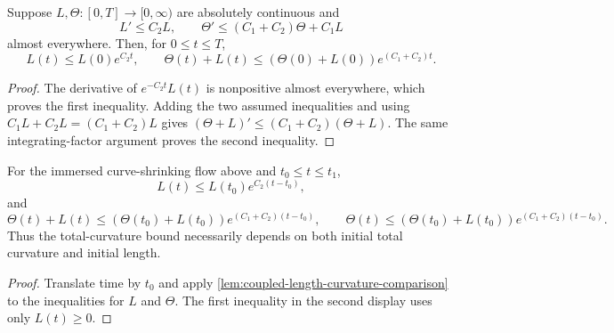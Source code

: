 \begin{lemma}
\label{lem:coupled-length-curvature-comparison}
\notready
Suppose $L,\Theta\colon[0,T]\to[0,\infty)$ are absolutely continuous and
\[
 L'\le C_2L,\qquad
 \Theta'\le(C_1+C_2)\Theta+C_1L
\]
almost everywhere.  Then, for $0\le t\le T$,
\[
 L(t)\le L(0)e^{C_2t},\qquad
 \Theta(t)+L(t)\le(\Theta(0)+L(0))e^{(C_1+C_2)t}.
\]
\end{lemma}
\begin{proof}
The derivative of $e^{-C_2t}L(t)$ is nonpositive almost everywhere, which
proves the first inequality.  Adding the two assumed inequalities and using
$C_1L+C_2L=(C_1+C_2)L$ gives
$(\Theta+L)'\le(C_1+C_2)(\Theta+L)$.  The same integrating-factor
argument proves the second inequality.
\end{proof}

\begin{theorem}
\label{thm:curve-flow-length-total-curvature-bounds}
\notready
For the immersed curve-shrinking flow above and $t_0\le t\le t_1$,
\[
 L(t)\le L(t_0)e^{C_2(t-t_0)},
\]
and
\[
 \Theta(t)+L(t)
 \le(\Theta(t_0)+L(t_0))e^{(C_1+C_2)(t-t_0)},
 \qquad
 \Theta(t)\le(\Theta(t_0)+L(t_0))e^{(C_1+C_2)(t-t_0)}.
\]
Thus the total-curvature bound necessarily depends on both initial
total curvature and initial length.
\end{theorem}
\begin{proof}
Translate time by $t_0$ and apply
\ref{lem:coupled-length-curvature-comparison} to the inequalities for $L$ and
$\Theta$.  The first inequality in the second display uses only $L(t)\ge0$.
\end{proof}

